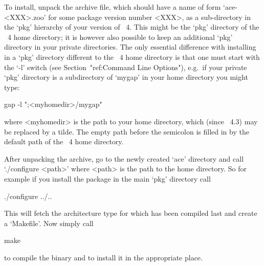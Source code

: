 


To install, unpack the archive file, which should have a name of  form
`ace-<XXX>.zoo'  for  some  package  version  number   <XXX>,   as   a
sub-directory in the `pkg' hierarchy of your version of {\GAP}~4. This
might be the `pkg' directory of the {\GAP}~4  home  directory;  it  is
however also possible to keep an additional `pkg'  directory  in  your
private directories. The only  essential  difference  with  installing
{\ACE} in a `pkg' directory different to the {\GAP}~4  home  directory
is  that  one  must  start  {\GAP}   with   the   `-l'   switch   (see
Section~"ref:Command  Line  Options"),  e.g.~if  your  private   `pkg'
directory is a subdirectory of `mygap'  in  your  home  directory  you
might type:

gap -l ";<myhomedir>/mygap"

where <myhomedir> is the path to your  home  directory,  which  (since
{\GAP}~4.3) may be replaced by a tilde.  The  empty  path  before  the
semicolon is filled in by  the  default  path  of  the  {\GAP}~4  home
directory.

After unpacking the archive, go to the newly created  `ace'  directory
and call `./configure <path>' where <path> is the path to  the  {\GAP}
home directory. So for example if you install the package in the  main
`pkg' directory call

\begintt
./configure ../..
\endtt

This  will fetch  the  architecture  type for  which  {\GAP} has  been
compiled last and create a `Makefile'. Now simply call

\begintt
make
\endtt

to compile the binary and to install it in the appropriate place.

